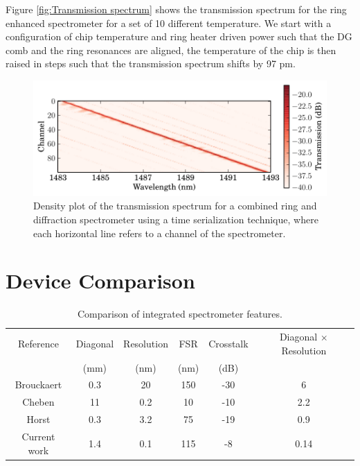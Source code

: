 \documentclass[12pt,twoside,english]{book}
\renewcommand{\~}{\perispomeni}%
\providecommand{\tabularnewline}{\\}
\numberwithin{equation}{section}
\numberwithin{figure}{section}
\begin{document}
Figure \ref{fig:Transmission spectrum} shows the transmission spectrum for the ring enhanced spectrometer for a set of 10 different temperature. We start with a configuration of chip temperature and ring heater driven power such that the DG comb and the ring resonances are aligned, the temperature of the chip is then raised in steps such that the transmission spectrum shifts by 97 pm.
%
\begin{figure}[h]
\noindent \begin{centering}
\includegraphics{graphs/hundred_density}
\par\end{centering}
\caption{Density plot of the transmission spectrum for a combined ring and diffraction spectrometer using a time serialization technique, where each horizontal line refers to a channel of the spectrometer.
\label{fig:transmission spectrum density}}
\end{figure}

\section{Device Comparison}
\begin{table}[h]
\begin{centering}
\begin{tabular}{cccccc}
\hline 
Reference & Diagonal & Resolution & FSR & Crosstalk & Diagonal $\times$ Resolution\tabularnewline
      & (mm)   & (nm)    & (nm) & (dB)   & 			  \tabularnewline
\hline
\hline 
Brouckaert\cite{Brouckaert:2007p82} & 0.3   & 20     & 150 & -30    & 6              \tabularnewline
Cheben\cite{Cheben:2007p133}   & 11    & 0.2    & 10  & -10    & 2.2             \tabularnewline
Horst\cite{Horst:2009p1764}   & 0.3   & 3.2    & 75  & -19    & 0.9             \tabularnewline
Current work\cite{Kyotoku:2010p786}    & 1.4   & 0.1    & 115 & -8    & 0.14            \tabularnewline
\hline
\end{tabular}\caption{Comparison of integrated spectrometer features.\label{table:device comparison}}
\par\end{centering}
\end{table}
\end{document}
